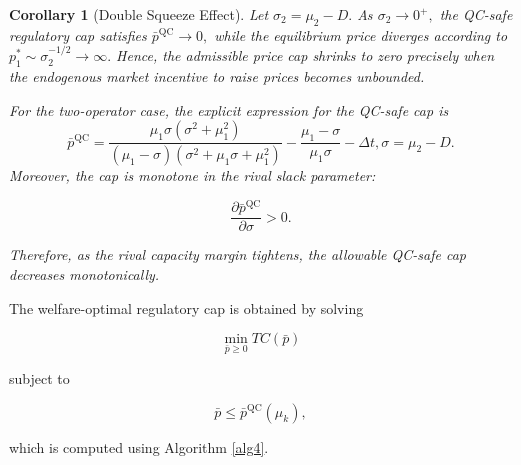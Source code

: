 \documentclass[review,3p,authoryear]{elsarticle}
\newtheorem{corollary}[theorem]{Corollary}
\begin{document}
\begin{corollary}[Double Squeeze Effect]\label{c2}
Let ${\sigma}_{2}={\mu}_{2}-D.$ As ${\sigma}_{2}{\to}0^{+},$ the QC-safe regulatory cap satisfies $\bar{p}^{\mathrm{QC}}{\to}0,$ while the equilibrium price diverges according to $p_{1}^{*}\ensuremath{\sim}{\sigma}_{2}^{-1/2}{\to}{\infty}.$ Hence, the admissible price cap shrinks to zero precisely when the endogenous market incentive to raise prices becomes unbounded.

For the two-operator case, the explicit expression for the QC-safe cap is
\begin{equation}
    \bar{p}^{\mathrm{QC}} = \frac{\mu_1 \sigma (\sigma^2 + \mu_1^2)}{(\mu_1 - \sigma)(\sigma^2 + \mu_1\sigma + \mu_1^2)} - \frac{\mu_1 - \sigma}{\mu_1 \sigma} - \Delta t, \sigma = \mu_2 - D.
\label{eq16}
\end{equation}
Moreover, the cap is monotone in the rival slack parameter:

\begin{equation}
\frac{{\partial}\bar{p}^{\mathrm{QC}}}{{\partial}{\sigma}}>0.
\end{equation}

Therefore, as the rival capacity margin tightens, the allowable QC-safe cap decreases monotonically.
\end{corollary}

The welfare-optimal regulatory cap is obtained by solving

\begin{equation}
\min_{\bar{p}{\ge}0}TC(\bar{p})
\end{equation}

subject to

\begin{equation}
\bar{p}{\le}\bar{p}^{\mathrm{QC}}({\mu}_{k}),
\end{equation}

which is computed using Algorithm \ref{alg4}.



\end{document}
